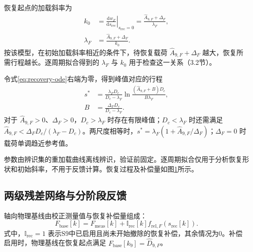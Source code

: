 \documentclass{JQR_LaTeX_Template-0507/JQRnew}
\begin{document}
恢复起点的加载斜率为
\begin{equation}
\label{eq:initial-slope}
\begin{aligned}
k_0&=\left.\frac{\mathrm dw_F}{\mathrm ds_{\mathrm{rec}}}\right|_{s_{\mathrm{rec}}=0}
=\frac{\widehat A_{9,F}+\Delta_F}{\lambda_F},\\
\lambda_F&=\frac{\widehat A_{9,F}+\Delta_F}{k_0}.
\end{aligned}
\end{equation}
按该模型，在初始加载斜率相近的条件下，待恢复载荷 $\widehat A_{9,F}+\Delta_F$ 越大，恢复所需行程越长。逐周期拟合得到的 $\lambda_F$ 与 $k_0$ 用于检查这一关系（3.2节）。

令式\eqref{eq:recovery-ode}右端为零，得到峰值对应的行程
\begin{equation}
\label{eq:peak-location}
\begin{aligned}
s^*&=\frac{\lambda_FD_c}{D_c-\lambda_F}
\ln\frac{(\widehat A_{9,F}+B)D_c}{B\lambda_F},\\
B&=\frac{\Delta_FD_c}{D_c-\lambda_F}.
\end{aligned}
\end{equation}
对于 $\widehat A_{9,F}>0$、$\Delta_F>0$，$D_c>\lambda_F$ 时存在有限峰值；$D_c<\lambda_F$ 时还需满足 $\widehat A_{9,F}<\Delta_FD_c/(\lambda_F-D_c)$。两尺度相等时，$s^*=\lambda_F(1+\widehat A_{9,F}/\Delta_F)$；$\Delta_F=0$ 时载荷单调趋近参考值。

参数由辨识集的重加载曲线离线辨识，验证前固定。逐周期拟合仅用于分析恢复形状和初始斜率，不用于反馈计算。恢复过程及补偿量如图\ref{fig3}所示。

\begin{figure}[H]
\centering
{}
\label{fig3}
\end{figure}

\subsection{两级残差网络与分阶段反馈}

轴向物理基线由校正测量值与恢复补偿量组成：
\begin{equation}
\label{eq:physical-baseline}
F_{\mathrm{base}}[k]=F_{\mathrm{meas}}[k]
+\mathbb I_{\mathrm{rec}}[k]f_{\mathrm{rel},F}(s_{\mathrm{rec}}[k]).
\end{equation}
式中，$\mathbb I_{\mathrm{rec}}=1$ 表示S9中已启用且尚未开始撤除的恢复补偿，其余情况为0。补偿启用时，物理基线在恢复起点满足 $F_{\mathrm{base}}[k_9]=\widehat D_{9,F}$。
\end{document}
